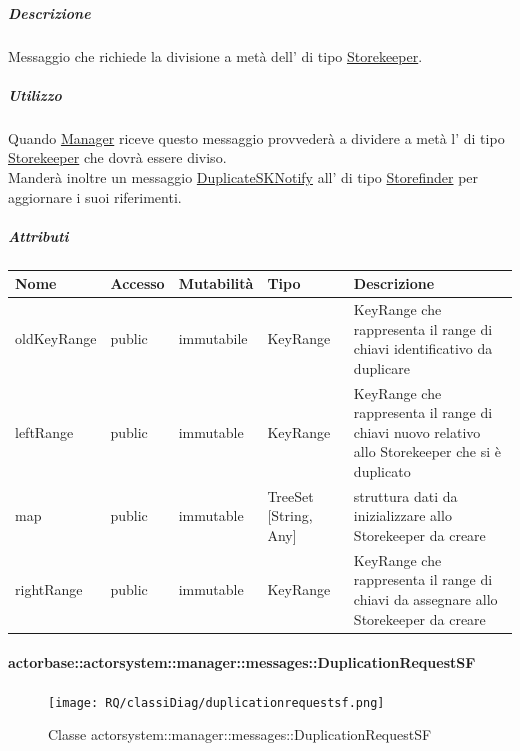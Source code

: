 \documentclass{scalatekids-article}
\begin{document}
\subparagraph{Descrizione}

Messaggio che richiede la divisione a metà dell' di tipo
\hyperref[sec:actorbase::actorsystem::storekeeper::Storekeeper]{Storekeeper}.

\subparagraph{Utilizzo}

Quando \hyperref[sec:actorbase::actorsystem::manager::Manager]{Manager}
riceve questo messaggio provvederà a dividere a metà l' di tipo
\hyperref[sec:actorbase::actorsystem::storekeeper::Storekeeper]{Storekeeper}
che dovrà essere diviso.\\Manderà inoltre un messaggio \hyperref[sec:actorbase::actorsystem::storefinder::messages::DuplicateSKNotify]{DuplicateSKNotify} all' di tipo
\hyperref[sec:actorbase::actorsystem::storefinder::Storefinder]{Storefinder}
per aggiornare i suoi riferimenti.

\subparagraph{Attributi}
\begin{tabular}{| p{3cm} | p{1.5cm} | p{2cm} | p{2cm} | p{8.5cm} |}
  \hline
  Nome & Accesso & Mutabilità & Tipo & Descrizione\\
  \hline
  oldKeyRange & public & immutabile & KeyRange & KeyRange che rappresenta il range di chiavi identificativo da duplicare\\
  \hline
  leftRange & public & immutable & KeyRange & KeyRange che rappresenta il range di chiavi nuovo relativo allo Storekeeper che si è duplicato\\
  \hline
  map & public & immutable & TreeSet [String, Any] & struttura dati da inizializzare allo Storekeeper da creare\\
  \hline
  rightRange & public & immutable & KeyRange & KeyRange che rappresenta il range di chiavi da assegnare allo Storekeeper da creare\\
  \hline
\end{tabular}

\paragraph{actorbase::actorsystem::manager::messages::DuplicationRequestSF}
\label{sec:actorbase::actorsystem::manager::messages::DuplicationRequestSF}

\begin{figure}[H]
  \begin{center}
    \texttt{[image: RQ/classiDiag/duplicationrequestsf.png]}
    \caption{Classe actorsystem::manager::messages::DuplicationRequestSF}
  \end{center}
\end{figure}
\end{document}
